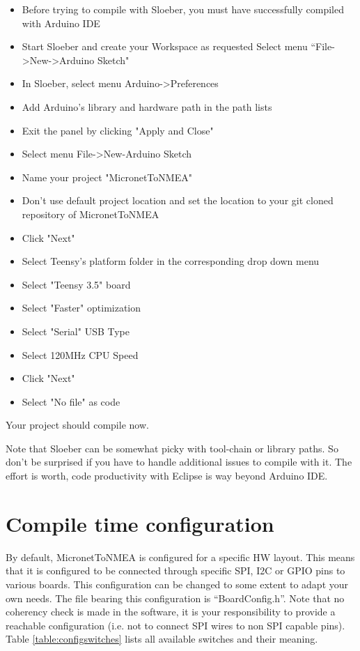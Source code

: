 \documentclass{report}
\begin{document}
\begin{itemize}
\item Before trying to compile with Sloeber, you must have successfully compiled with Arduino IDE
\item Start Sloeber and create your Workspace as requested Select menu “File->New->Arduino Sketch"
\item In Sloeber, select menu Arduino->Preferences
\item Add Arduino's library and hardware path in the path lists
\item Exit the panel by clicking "Apply and Close"
\item Select menu File->New-Arduino Sketch
\item Name your project "MicronetToNMEA"
\item Don't use default project location and set the location to your git cloned repository of MicronetToNMEA
\item Click "Next"
\item Select Teensy's platform folder
in the corresponding drop down menu
\item Select "Teensy 3.5" board
\item Select "Faster" optimization
\item Select "Serial" USB Type
\item Select 120MHz CPU Speed
\item Click "Next"
\item Select "No file" as code
\end{itemize}

Your project should compile now.

Note that Sloeber can be somewhat picky with tool-chain or library paths. So don’t be surprised if you have to handle additional issues to compile with it. The effort is worth, code productivity with Eclipse is way beyond Arduino IDE.

\section{Compile time configuration}

By default, MicronetToNMEA is configured for a specific HW layout. This means that it is configured to be connected through specific SPI, I2C or GPIO pins to various boards. This configuration can be changed to some extent to adapt your own needs. The file bearing this configuration is “BoardConfig.h”. Note that no coherency check is made in the software, it is your responsibility to provide a reachable configuration (i.e. not to connect SPI wires to non SPI capable pins). Table {\ref{table:configswitches}} lists all available switches and their meaning.
\end{document}
